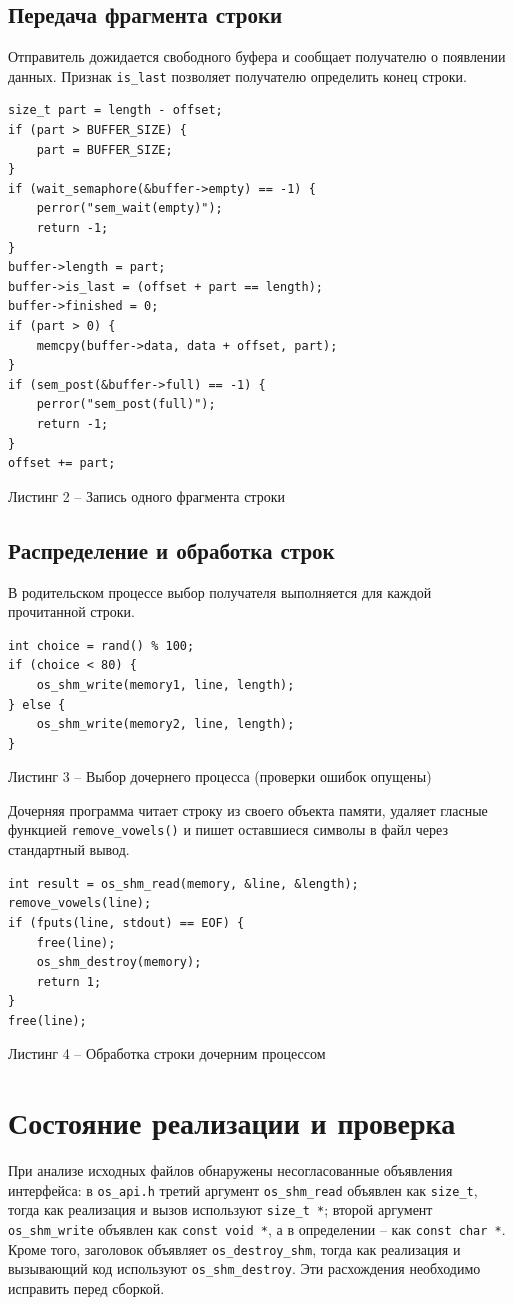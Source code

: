 \documentclass[12pt,a4paper]{article}
\begin{document}
\subsection{Передача фрагмента строки}
Отправитель дожидается свободного буфера и сообщает получателю о появлении данных. Признак \texttt{is\_last} позволяет получателю определить конец строки.
\begin{lstlisting}
size_t part = length - offset;
if (part > BUFFER_SIZE) {
    part = BUFFER_SIZE;
}
if (wait_semaphore(&buffer->empty) == -1) {
    perror("sem_wait(empty)");
    return -1;
}
buffer->length = part;
buffer->is_last = (offset + part == length);
buffer->finished = 0;
if (part > 0) {
    memcpy(buffer->data, data + offset, part);
}
if (sem_post(&buffer->full) == -1) {
    perror("sem_post(full)");
    return -1;
}
offset += part;
\end{lstlisting}
\begin{center}\small Листинг 2 -- Запись одного фрагмента строки\end{center}
\clearpage
\subsection{Распределение и обработка строк}
В родительском процессе выбор получателя выполняется для каждой прочитанной строки.
\begin{lstlisting}
int choice = rand() % 100;
if (choice < 80) {
    os_shm_write(memory1, line, length);
} else {
    os_shm_write(memory2, line, length);
}
\end{lstlisting}
\begin{center}\small Листинг 3 -- Выбор дочернего процесса (проверки ошибок опущены)\end{center}

Дочерняя программа читает строку из своего объекта памяти, удаляет гласные функцией \texttt{remove\_vowels()} и пишет оставшиеся символы в файл через стандартный вывод.
\begin{lstlisting}
int result = os_shm_read(memory, &line, &length);
remove_vowels(line);
if (fputs(line, stdout) == EOF) {
    free(line);
    os_shm_destroy(memory);
    return 1;
}
free(line);
\end{lstlisting}
\begin{center}\small Листинг 4 -- Обработка строки дочерним процессом\end{center}
\section{Состояние реализации и проверка}
При анализе исходных файлов обнаружены несогласованные объявления интерфейса: в \texttt{os\_api.h} третий аргумент \texttt{os\_shm\_read} объявлен как \texttt{size\_t}, тогда как реализация и вызов используют \texttt{size\_t *}; второй аргумент \texttt{os\_shm\_write} объявлен как \texttt{const void *}, а в определении -- как \texttt{const char *}. Кроме того, заголовок объявляет \texttt{os\_destroy\_shm}, тогда как реализация и вызывающий код используют \texttt{os\_shm\_destroy}. Эти расхождения необходимо исправить перед сборкой.
\end{document}
